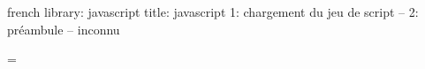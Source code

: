 \startmessages  french  library: javascript
  title: javascript
      1: chargement du jeu de script --
      2: préambule -- inconnu
\stopmessages



\newif\iftraceJScode \traceJScodefalse

\let\traceJScode\traceJScodetrue


\bgroup
{}=\@@letter
\gdef\delcharacter{^^7f}
\egroup


\newif\ifminimalizeJScode    \minimalizeJScodetrue



